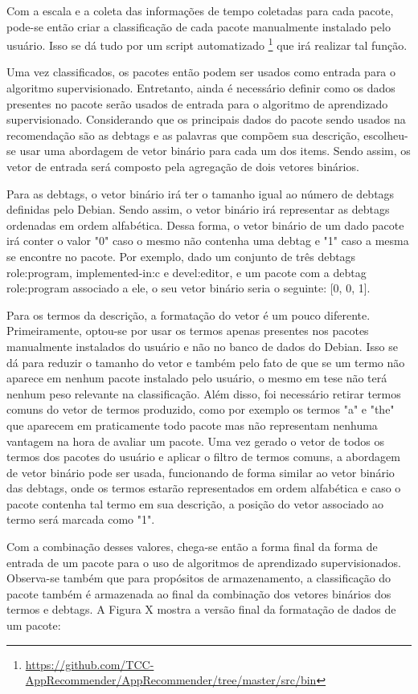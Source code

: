 Com a escala e a coleta das informações de tempo coletadas para cada pacote,
pode-se então criar a classificação de cada pacote manualmente instalado pelo usuário.
Isso se dá tudo por um script automatizado \footnote{\url{https://github.com/TCC-AppRecommender/AppRecommender/tree/master/src/bin}}
que irá realizar tal função.

Uma vez classificados, os pacotes então podem ser usados como entrada para o algoritmo supervisionado.
Entretanto, ainda é necessário definir como os dados presentes no pacote serão usados de entrada para o
algoritmo de aprendizado supervisionado. Considerando que os principais dados do pacote sendo usados na
recomendação são as debtags e as palavras que compõem sua descrição, escolheu-se usar uma abordagem de
vetor binário para cada um dos items. Sendo assim, os vetor de entrada será composto pela agregação de dois vetores
binários.

Para as debtags, o vetor binário irá ter o tamanho igual ao número de debtags definidas pelo Debian. Sendo assim, o 
vetor binário irá representar as debtags ordenadas em ordem alfabética. Dessa forma,
o vetor binário de um dado pacote irá conter o valor "0" caso o mesmo não contenha uma debtag e "1" caso a mesma se encontre
no pacote. Por exemplo, dado um conjunto de três debtags role:program, implemented-in:c e devel:editor, e um pacote com a debtag
role:program associado a ele, o seu vetor binário seria o seguinte: [0, 0, 1].

Para os termos da descrição, a formatação do vetor é um pouco diferente. Primeiramente, optou-se por usar os termos apenas presentes
nos pacotes manualmente instalados do usuário e não no banco de dados do Debian. Isso se dá para reduzir o tamanho do vetor e também
pelo fato de que se um termo não aparece em nenhum pacote instalado pelo usuário, o mesmo em tese não terá nenhum peso relevante na
classificação. Além disso, foi necessário retirar termos comuns do vetor de termos produzido, como por exemplo os termos "a" e "the" que
aparecem em praticamente todo pacote mas não representam nenhuma vantagem na hora de avaliar um pacote. Uma vez gerado o vetor de todos os
termos dos pacotes do usuário e aplicar o filtro de termos comuns, a abordagem de vetor binário pode ser usada, funcionando de forma
similar ao vetor binário das debtags, onde os termos estarão representados em ordem alfabética e caso o pacote contenha tal termo em sua
descrição, a posição do vetor associado ao termo será marcada como "1".

Com a combinação desses valores, chega-se então a forma final da forma de entrada de um pacote para o uso de algoritmos de aprendizado 
supervisionados. Observa-se também que para propósitos de  armazenamento, a classificação do pacote também é armazenada ao final da combinação
dos vetores binários dos termos e debtags. A Figura X mostra a versão final da formatação de dados de um pacote:

